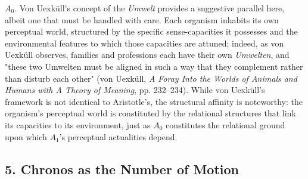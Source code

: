 $A_0$. Von Uexküll's concept of the \textit{Umwelt} provides a suggestive parallel here, albeit one that must be handled with care. Each organism inhabits its own perceptual world, structured by the specific sense-capacities it possesses and the environmental features to which those capacities are attuned; indeed, as von Uexküll observes, families and professions each have their own \textit{Umwelten}, and "these two Umwelten must be aligned in such a way that they complement rather than disturb each other" (von Uexküll, \textit{A Foray Into the Worlds of Animals and Humans with A Theory of Meaning}, pp. 232--234). While von Uexküll's framework is not identical to Aristotle's, the structural affinity is noteworthy: the organism's perceptual world is constituted by the relational structures that link its capacities to its environment, just as $A_0$ constitutes the relational ground upon which $A_1$'s perceptual actualities depend. 

\subsection*{5. Chronos as the Number of Motion}

